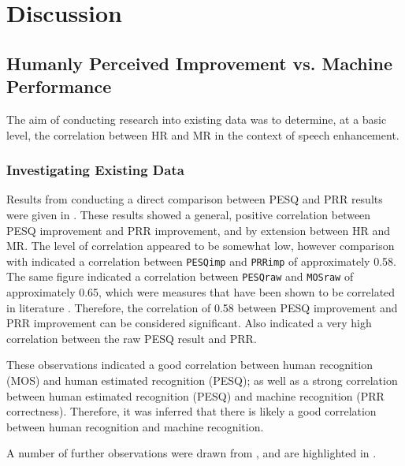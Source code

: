 
\chapter{Discussion}

\acresetall


\section{Humanly Perceived Improvement vs. Machine Performance}

The aim of conducting research into existing data was to determine,
at a basic level, the correlation between \ac{HR} and \ac{MR} in
the context of speech enhancement.


\subsection{Investigating Existing Data}

Results from conducting a direct comparison between \ac{PESQ} and
\ac{PRR} results were given in . These results
showed a general, positive correlation between \ac{PESQ} improvement
and \ac{PRR} improvement, and by extension between \ac{HR} and \ac{MR}.
The level of correlation appeared to be somewhat low, however comparison
with  indicated a correlation between \lstinline!PESQimp!
and \lstinline!PRRimp! of approximately 0.58. The same figure indicated
a correlation between \lstinline!PESQraw! and \lstinline!MOSraw!
of approximately 0.65, which were measures that have been shown to
be correlated in literature \cite{Kitawaki2007,Rix2003,Rix2001}.
Therefore, the correlation of 0.58 between \ac{PESQ} improvement
and \ac{PRR} improvement can be considered significant. 
Also indicated a very high correlation between the raw \ac{PESQ}
result and \ac{PRR}.

These observations indicated a good correlation between human recognition
(\ac{MOS}) and human estimated recognition (\ac{PESQ}); as well
as a strong correlation between human estimated recognition (\ac{PESQ})
and machine recognition (\ac{PRR} correctness). Therefore, it was
inferred that there is likely a good correlation between human recognition
and machine recognition.

A number of further observations were drawn from ,
and are highlighted in .

